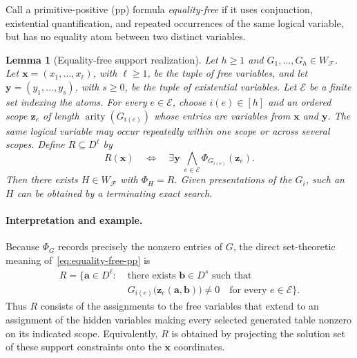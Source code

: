 \documentclass[11pt]{article}
\theoremstyle{plain}
\newtheorem{lemma}[lemma]{Lemma}
\theoremstyle{definition}
\theoremstyle{remark}
\newcommand{\cF}{\mathcal F}
\newcommand{\SuppRel}[1]{\Phi_{#1}}
\DeclareMathOperator{\arity}{arity}
\begin{document}
Call a primitive-positive (pp) formula \emph{equality-free} if it uses
conjunction, existential quantification, and repeated occurrences of the same
logical variable, but has no equality atom between two distinct variables.

\begin{lemma}[Equality-free support realization]
\label{lem:equality-free-support-realization}
Let $h\ge1$ and $G_1,\ldots,G_h\in W_{\cF}$.  Let
$\mathbf x=(x_1,\ldots,x_\ell)$, with $\ell\ge1$, be the tuple of free
variables, and let $\mathbf y=(y_1,\ldots,y_s)$, with $s\ge0$, be the tuple
of existential variables.  Let $\mathcal E$ be a finite set indexing the
atoms.  For every $e\in\mathcal E$, choose
$i(e)\in[h]$ and an ordered scope $\mathbf z_e$ of length
$\arity(G_{i(e)})$ whose entries are variables from $\mathbf x$ and
$\mathbf y$.  The same logical variable may occur repeatedly within one
scope or across several scopes.  Define $R\subseteq D^\ell$ by
\begin{equation}
  R(\mathbf x)
  \quad\Longleftrightarrow\quad
  \exists\mathbf y\;
  \bigwedge_{e\in\mathcal E}
       \SuppRel{G_{i(e)}}(\mathbf z_e).
  \label{eq:equality-free-pp}
\end{equation}
Then there exists $H\in W_{\cF}$ with $\SuppRel H=R$.  Given presentations
of the $G_i$, such an $H$ can be obtained by a terminating exact search.
\end{lemma}

\paragraph{Interpretation and example.}
Because $\SuppRel G$ records precisely the nonzero entries of $G$, the direct
set-theoretic meaning of~\eqref{eq:equality-free-pp} is
\begin{equation*}
\begin{aligned}
  R=\{\mathbf a\in D^\ell:\;&
      \text{there exists }\mathbf b\in D^s\text{ such that}\\
    &G_{i(e)}\bigl(\mathbf z_e(\mathbf a,\mathbf b)\bigr)\ne0
      \quad\text{for every }e\in\mathcal E\}.
\end{aligned}
\end{equation*}
Thus $R$ consists of the assignments to the free variables that extend to an
assignment of the hidden variables making every selected generated table
nonzero on its indicated scope.  Equivalently, $R$ is obtained by projecting
the solution set of these support constraints onto the $\mathbf x$
coordinates.
\end{document}

